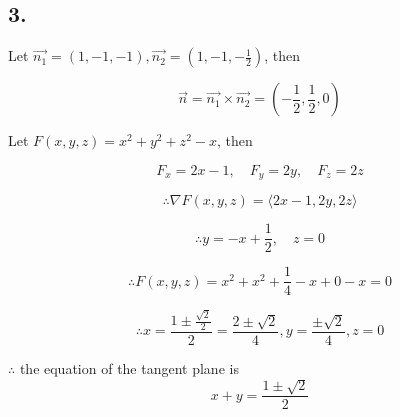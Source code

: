 \documentclass{article}
\begin{document}
  \subsection*{3. }

  Let $\overrightarrow{n_1} = (1, -1, -1), \overrightarrow{n_2} = (1, -1, -\frac 1 2)$, then

  $$\overrightarrow{n} = \overrightarrow{n_1} \times \overrightarrow{n_2} = (-\frac 1 2, \frac 1 2, 0)$$

  Let $F(x, y, z) = x^2+y^2+z^2-x$, then

  $$F_x = 2x-1, \quad F_y = 2y, \quad F_z = 2z$$

  $$\therefore \nabla F(x, y, z) = \langle 2x-1, 2y, 2z \rangle$$

  $$\therefore y=-x+\frac 1 2, \quad z = 0$$

  $$\therefore F(x, y, z) = x^2 + x^2 + \frac 1 4 - x + 0 - x = 0$$

  $$\therefore x = \frac{1\pm \frac{\sqrt 2}{2}}{2} = \frac{2 \pm \sqrt 2}{4}, y = \frac{\pm \sqrt 2}{4}, z = 0$$

  $\therefore$ the equation of the tangent plane is $$x + y = \frac{1 \pm \sqrt 2}{2}$$
\end{document}
